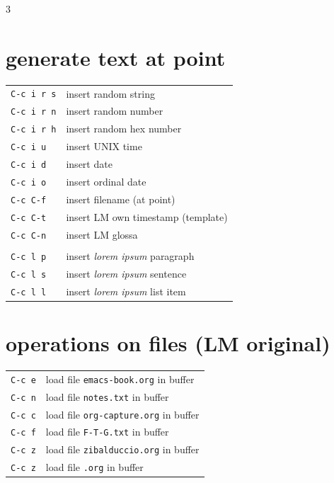 \documentclass[11pt,landscape,a4paper]{article}
\begin{document}
\begin{multicols}{3}
\columnbreak


\section{generate text at point}

\begin{tabular}{@{}ll@{}}
	{\color{darkred}\verb|C-c i r s|} 			&  insert random string\\ 
	{\color{darkred}\verb|C-c i r n|} 			&  insert random number\\ 
	{\color{darkred}\verb|C-c i r h|} 			&  insert random hex number\\ 
	{\color{darkred}\verb|C-c i u|}         &  insert UNIX time\\
	{\color{darkred}\verb|C-c i d|}         &  insert date\\ 
	{\color{darkred}\verb|C-c i o|}         &  insert ordinal date\\ 
	{\color{darkred}\verb|C-c C-f|} 	    &  insert filename (at point)\\ 
	{\color{darkred}\verb|C-c C-t|} 		&  insert LM own timestamp (template)\\ 
	{\color{darkred}\verb|C-c C-n|} 		&  insert LM glossa\\ 
	\\
	{\color{cgreen}\verb|C-c l p|}		&  insert \emph{lorem ipsum} paragraph\\ 
	{\color{cgreen}\verb|C-c l s|}		&  insert \emph{lorem ipsum} sentence\\ 
	{\color{cgreen}\verb|C-c l l|}		&  insert \emph{lorem ipsum} list item\\ 
\end{tabular}

\section{operations on files (LM original)}

\begin{tabular}{@{}ll@{}}
	{\color{darkred}\verb|C-c e|} 			& load file \verb|emacs-book.org| in buffer\\
	{\color{darkred}\verb|C-c n|} 			& load file \verb|notes.txt| in buffer\\
	{\color{darkred}\verb|C-c c|} 			& load file \verb|org-capture.org| in buffer\\
	{\color{darkred}\verb|C-c f|} 			& load file \verb|F-T-G.txt| in buffer\\
	{\color{darkred}\verb|C-c z|} 			& load file \verb|zibalduccio.org| in buffer\\
	{\color{orange}\verb|C-c z|} 			& load file \verb|.org| in buffer\\
\end{tabular}



\end{multicols}
\end{document}
